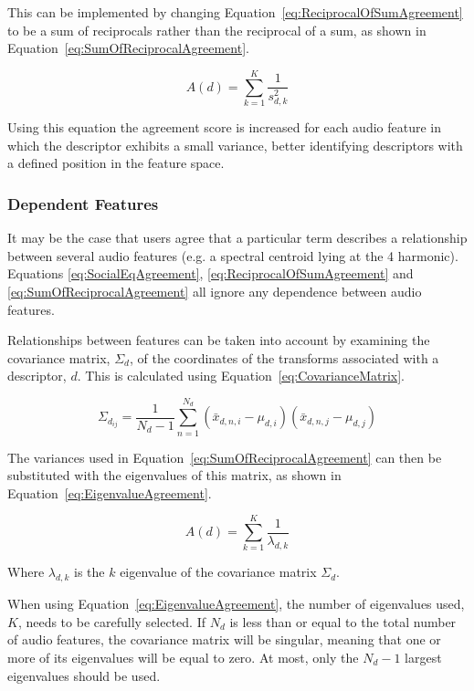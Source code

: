 			This can be implemented by changing Equation~\ref{eq:ReciprocalOfSumAgreement} to be a sum of
			reciprocals rather than the reciprocal of a sum, as shown in
			Equation~\ref{eq:SumOfReciprocalAgreement}.

			\begin{equation}
				A(d) = \sum_{k = 1}^{K} \frac{1}{s_{d,k}^{2}}
				\label{eq:SumOfReciprocalAgreement}
			\end{equation}

			Using this equation the agreement score is increased for each audio feature in which the
			descriptor exhibits a small variance, better identifying descriptors with a defined position in
			the feature space.

		\subsubsection*{Dependent Features}
			It may be the case that users agree that a particular term describes a relationship between several
			audio features (e.g. a spectral centroid lying at the 4 harmonic). Equations
			\ref{eq:SocialEqAgreement}, \ref{eq:ReciprocalOfSumAgreement} and \ref{eq:SumOfReciprocalAgreement}
			all ignore any dependence between audio features.

			Relationships between features can be taken into account by examining the covariance matrix,
			$\Sigma_{d}$, of the coordinates of the transforms associated with a descriptor, $d$. This is
			calculated using Equation~\ref{eq:CovarianceMatrix}.

			\begin{equation}
				{\Sigma_{d_{ij}}} = \frac{1}{N_{d} - 1} \sum_{n = 1}^{N_{d}} 
						     (\bar{x}_{d,n,i} - \mu_{d,i})(\bar{x}_{d,n,j} - \mu_{d,j})
				\label{eq:CovarianceMatrix}
			\end{equation}
			
			The variances used in Equation~\ref{eq:SumOfReciprocalAgreement} can then be substituted with the
			eigenvalues of this matrix, as shown in Equation~\ref{eq:EigenvalueAgreement}.

			\begin{equation}
				A(d) = \sum_{k = 1}^{K} \frac{1}{\lambda_{d,k}}
				\label{eq:EigenvalueAgreement}
			\end{equation}
			
			Where $\lambda_{d, k}$ is the $k$ eigenvalue of the covariance matrix $\Sigma_{d}$.

			When using Equation~\ref{eq:EigenvalueAgreement}, the number of eigenvalues used, $K$, needs to be
			carefully selected. If $N_{d}$ is less than or equal to the total number of audio features, the
			covariance matrix will be singular, meaning that one or more of its eigenvalues will be equal to
			zero. At most, only the $N_{d} - 1$ largest eigenvalues should be used.
			
